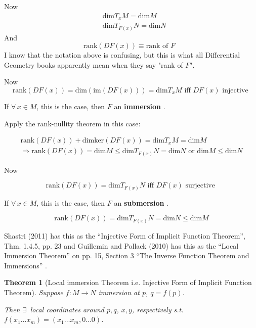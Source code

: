 \documentclass[10pt]{amsart}
\newtheorem{theorem}{Theorem}
\begin{document}
\begin{multicols*}{2}
Now 
\[
\begin{aligned}
& \text{dim}T_xM = \text{dim}M \\ 
& \text{dim}T_{F(x)}N = \text{dim}N 
\end{aligned}
\]
And 
\[
\text{rank}(DF(x)) \equiv \text{rank of $F$ }
\]
I know that the notation above is confusing, but this is what all Differential Geometry books apparently mean when they say "rank of $F$".  

Now  
\[
\text{rank}(DF(x)) = \text{dim}(\text{im}(DF(x)))  = \text{dim}T_xM \text{ iff } DF(x) \text{ injective }  
\]

If $\forall \, x \in M$, this is the case, then $F$ an \textbf{ immersion }.  

Apply the rank-nullity theorem in this case:  

\[
\begin{gathered}
	\text{rank}(DF(x)) + \text{dim}\text{ker}(DF(x)) = \text{dim}T_xM = \text{dim}M \\ 
	\Longrightarrow \text{rank}(DF(x)) = \text{dim}M \leq \text{dim}T_{F(x)}N = \text{dim}N \text{ or } \text{dim}M \leq \text{dim}N 
\end{gathered}
\]

Now 

\[
\text{rank}(DF(x)) = \text{dim}T_{F(x)}N \text{ iff } DF(x) \text{ surjective }  
\]

If $\forall \, x \in M$, this is the case, then $F$ an \textbf{ submersion }.  

\[
 \text{rank}(DF(x)) = \text{dim}T_{F(x)}N = \text{dim}N  \leq \text{dim}M  
\]

Shastri (2011) has this as the ``Injective Form of Implicit Function Theorem'', Thm. 1.4.5, pp. 23 and Guillemin and Pollack (2010) has this as the ``Local Immersion Theorem'' on pp. 15, Section 3 ``The Inverse Function Theorem and Immersions'' \cite{VGuilleminAPollack2010}.  

\begin{theorem}[Local immersion Theorem i.e. Injective Form of Implicit Function Theorem]
  Suppose $f:M\to N$ immersion at $p$, $q=f(p)$.  

Then $\exists \, $ local coordinates around $p,q$, $x,y$, respectively s.t. $f(x_1\dots x_m) = (x_1 \dots x_m,0 \dots 0)$.  

\end{theorem}


\end{multicols*}
\end{document}

